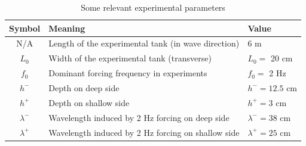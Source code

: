 \documentclass[12pt]{article}
\newcommand{\lamm}{\lambda^{-}}
\newcommand{\lamp}{\lambda^{+}}
\newcommand{\hm}{h^{-}}
\newcommand{\hp}{h^{+}}
\begin{document}
\begin{table}%
\begin{center}
\caption{Some relevant experimental parameters} 
\vspace{0.3 pc}
\begin{tabular}{c l l}
\hline
\hspace{0.5pc} Symbol
\hspace{0.5pc} & Meaning 
\hspace{0.5pc} & Value \\
\hline
N/A		& Length of the experimental tank (in wave direction)	& 6 m	\\
$L_0$	& Width of the experimental tank	 (transverse)		& $L_0 = $ 20 cm	\\
$f_0$	& Dominant forcing frequency in experiments	& $f_0 = $ 2 Hz	\\
$\hm$	& Depth on deep side						& $\hm = 12.5$ cm \\
$\hp$	& Depth on shallow side					& $\hp = 3$ cm \\
$\lamm$	& Wavelength induced by 2 Hz forcing on deep side	& $\lamm = 38$ cm	\\
$\lamp$	& Wavelength induced by 2 Hz forcing on shallow side	& $\lamp = 25$ cm	\\
\hline
\end{tabular}
\end{center}
\end{table}
 
\end{document}
